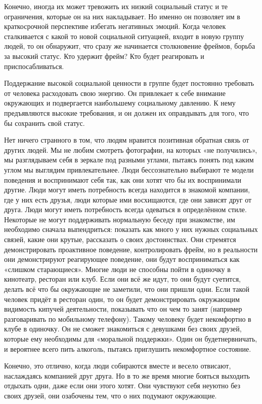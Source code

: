 Конечно, иногда их может тревожить их низкий социальный статус и те ограничения, которые он на них накладывает. Но именно он позволяет им в краткосрочной перспективе избегать негативных эмоций. Когда человек сталкивается с какой то новой социальной ситуацией, входит в новую группу людей, то он обнаружит, что сразу же начинается столкновение фреймов, борьба за высокий статус. Кто удержит фрейм? Кто будет реагировать и приспосабливаться.

Поддержание высокой социальной ценности в группе будет постоянно требовать от человека расходовать свою энергию. Он привлекает к себе внимание окружающих и подвергается наибольшему социальному давлению. К нему предъявляются высокие требования, и он должен их оправдывать для того, что бы сохранить свой статус.

Нет ничего странного в том, что людям нравится позитивная обратная связь от других людей. Мы не любим смотреть фотографии, на которых «не получились», мы разглядываем себя в зеркале под разными углами, пытаясь понять под каким углом мы выглядим привлекательнее. Люди бессознательно выбирают те модели поведения и воспринимают себя так, как они хотят что бы их воспринимали другие. Люди могут иметь потребность всегда находится в знакомой компании, где у них есть друзья, люди которые ими восхищаются, где они зависят друг от друга. Люди могут иметь потребность всегда одеваться в определённом стиле. Некоторые не могут поддерживать нормальную беседу при знакомстве, им необходимо сначала выпендриться: показать как много у них нужных социальных связей, какие они крутые, рассказать о своих достоинствах. Они стремятся демонстрировать проактивное поведение, контролировать фрейм, но в реальности они демонстрируют реагирующее поведение, они будут восприниматься как «слишком старающиеся». Многие люди не способны пойти в одиночку в кинотеатр, ресторан или клуб. Если они всё же идут, то они будут суетится, делать всё что бы окружающие не заметили, что они пришли одни. Если такой человек придёт в ресторан один, то он будет демонстрировать окружающим видимость кипучей деятельности, показывать что он чем то занят (например разговаривать по мобильному телефону). Такому человеку будет некомфортно в клубе в одиночку. Он не сможет знакомиться с девушками без своих друзей, которые ему необходимы для «моральной поддержки». Один он будетнервничать, и вероятнее всего пить алкоголь, пытаясь приглушить некомфортное состояние.

Конечно, это отлично, когда люди собираются вместе и весело отвисают, наслаждаясь компанией друг друга. Но в то же время многие бояться выходить отдыхать одни, даже если они этого хотят. Они чувствуют себя неуютно без своих друзей, они озабочены тем, что о них подумают окружающие.

